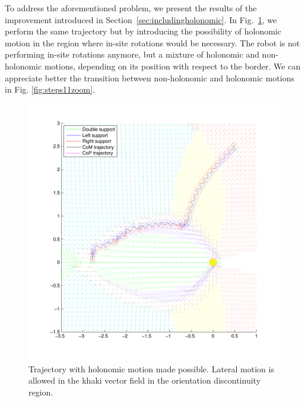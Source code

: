 To address the aforementioned problem, we present the results of the improvement introduced in Section~\ref{sec:includingholonomic}. In Fig.~\ref{fig:steps11}, we perform the same trajectory but by introducing the possibility of holonomic motion in the region where in-site rotations would be necessary. The robot is not performing in-site rotations anymore, but a mixture of holonomic and non-holonomic motions, depending on its position with respect to the border. We can appreciate better the transition between non-holonomic and holonomic motions in Fig. \ref{fig:steps11zoom}. %

\begin{figure}[ht]
\centering
\includegraphics[scale=0.425]{figures/steps11.pdf}
\caption{Trajectory with holonomic motion made possible. Lateral motion is allowed in the khaki vector field in the orientation discontinuity region.}
\label{fig:steps11}
\end{figure}

